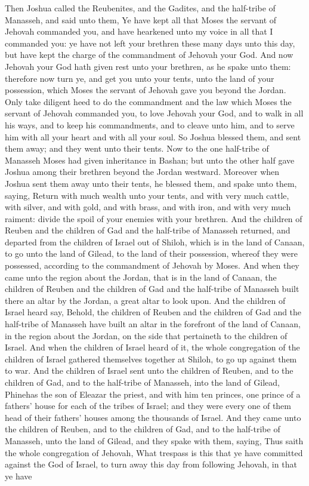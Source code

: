 Then Joshua called the Reubenites, and the Gadites, and the half-tribe of Manasseh, and said unto them, Ye have kept all that Moses the servant of Jehovah commanded you, and have hearkened unto my voice in all that I commanded you: ye have not left your brethren these many days unto this day, but have kept the charge of the commandment of Jehovah your God. And now Jehovah your God hath given rest unto your brethren, as he spake unto them: therefore now turn ye, and get you unto your tents, unto the land of your possession, which Moses the servant of Jehovah gave you beyond the Jordan. Only take diligent heed to do the commandment and the law which Moses the servant of Jehovah commanded you, to love Jehovah your God, and to walk in all his ways, and to keep his commandments, and to cleave unto him, and to serve him with all your heart and with all your soul. So Joshua blessed them, and sent them away; and they went unto their tents.  Now to the one half-tribe of Manasseh Moses had given inheritance in Bashan; but unto the other half gave Joshua among their brethren beyond the Jordan westward. Moreover when Joshua sent them away unto their tents, he blessed them, and spake unto them, saying, Return with much wealth unto your tents, and with very much cattle, with silver, and with gold, and with brass, and with iron, and with very much raiment: divide the spoil of your enemies with your brethren. And the children of Reuben and the children of Gad and the half-tribe of Manasseh returned, and departed from the children of Israel out of Shiloh, which is in the land of Canaan, to go unto the land of Gilead, to the land of their possession, whereof they were possessed, according to the commandment of Jehovah by Moses.  And when they came unto the region about the Jordan, that is in the land of Canaan, the children of Reuben and the children of Gad and the half-tribe of Manasseh built there an altar by the Jordan, a great altar to look upon. And the children of Israel heard say, Behold, the children of Reuben and the children of Gad and the half-tribe of Manasseh have built an altar in the forefront of the land of Canaan, in the region about the Jordan, on the side that pertaineth to the children of Israel. And when the children of Israel heard of it, the whole congregation of the children of Israel gathered themselves together at Shiloh, to go up against them to war.  And the children of Israel sent unto the children of Reuben, and to the children of Gad, and to the half-tribe of Manasseh, into the land of Gilead, Phinehas the son of Eleazar the priest, and with him ten princes, one prince of a fathers’ house for each of the tribes of Israel; and they were every one of them head of their fathers’ houses among the thousands of Israel. And they came unto the children of Reuben, and to the children of Gad, and to the half-tribe of Manasseh, unto the land of Gilead, and they spake with them, saying, Thus saith the whole congregation of Jehovah, What trespass is this that ye have committed against the God of Israel, to turn away this day from following Jehovah, in that ye have 